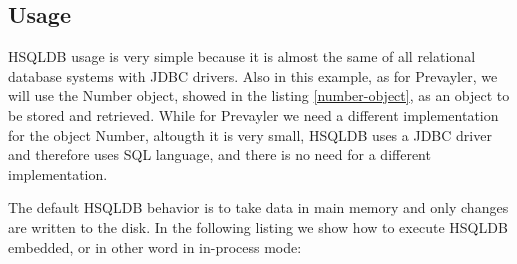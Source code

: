 			\subsection{Usage}
HSQLDB usage is very simple because it is almost the same of all relational database systems with JDBC drivers. Also in this example, as for Prevayler, we will use the Number object, showed in the listing \ref{number-object}, as an object to be stored and retrieved. While for Prevayler we need a different implementation for the object Number, altougth it is very small, HSQLDB uses a JDBC driver and therefore uses SQL language, and there is no need for a different implementation. 

The default HSQLDB behavior is to take data in main memory and only changes are written to the disk. In the following listing we show how to execute HSQLDB embedded, or in other word in in-process mode:
